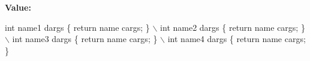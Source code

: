 {\bfseries Value\+:}
\begin{DoxyCode}
\textcolor{keywordtype}{int} name1 dargs \{ \textcolor{keywordflow}{return} name cargs; \}                          \(\backslash\)
  int name2 dargs \{ \textcolor{keywordflow}{return} name cargs; \}                          \(\backslash\)
  int name3 dargs \{ \textcolor{keywordflow}{return} name cargs; \}                          \(\backslash\)
  int name4 dargs \{ \textcolor{keywordflow}{return} name cargs; \}
\end{DoxyCode}
